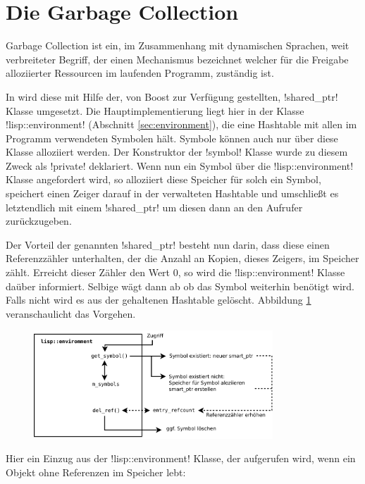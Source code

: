 \section{Die Garbage Collection}
\label{sec:shared_ptr}

Garbage Collection ist ein, im Zusammenhang mit dynamischen Sprachen,
weit verbreiteter Begriff, der
einen Mechanismus bezeichnet welcher für die Freigabe alloziierter
Ressourcen im laufenden Programm, zuständig
ist.

In \projectname{} wird diese mit Hilfe der, von Boost zur Verfügung
gestellten, !shared_ptr! Klasse umgesetzt.
Die Hauptimplementierung liegt hier in der Klasse
!lisp::environment! (Abschnitt \ref{sec:environment}),
die eine Hashtable mit allen
im Programm verwendeten Symbolen hält.
Symbole können auch nur über diese Klasse alloziiert werden.
Der Konstruktor der !symbol! Klasse wurde zu diesem Zweck als !private! deklariert.
Wenn nun ein Symbol über die !lisp::environment! Klasse angefordert wird,
so alloziiert diese Speicher für solch ein Symbol,
speichert einen Zeiger darauf in der verwalteten Hashtable
und umschließt es letztendlich mit einem !shared_ptr!
um diesen dann an den Aufrufer zurückzugeben.

Der Vorteil der genannten !shared_ptr! besteht nun darin,
dass diese einen Referenzzähler unterhalten,
der die Anzahl an Kopien, dieses Zeigers, im Speicher zählt.
Erreicht dieser Zähler den Wert $0$, so
wird die !lisp::environment! Klasse daüber informiert.
Selbige wägt dann ab ob das Symbol weiterhin benötigt
wird. Falls nicht wird es aus der gehaltenen Hashtable gelöscht.
Abbildung \ref{fig:garbage} veranschaulicht das Vorgehen.

\begin{figure}[htbp]
\centering
{}
\includegraphics[width=0.8\textwidth]{images/garbage.pdf}
\label{fig:garbage}
\end{figure}

Hier ein Einzug aus der !lisp::environment! Klasse, der aufgerufen wird, wenn
ein Objekt ohne Referenzen im Speicher lebt:

